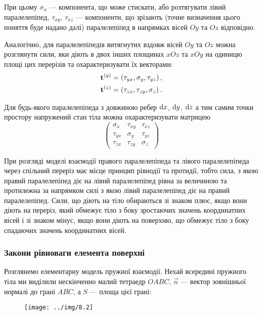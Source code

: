 \begin{remark}
	При цьому $\sigma_x$ --- компонента, що може стискати, або розтягувати лівий паралелепіпед, $\tau_{xy}$, $\tau_{xz}$ --- компоненти, що зрізають (точне визначення цього поняття буде надано далі) паралелепіпед в напрямках вісей $Oy$ та $Oz$ відповідно.
\end{remark}

Аналогічно, для паралелепіпедів витягнутих вздовж вісей $Oy$ та $Oz$ можна розглянути сили, яки діють в двох інших площинах $xOz$ та $xOy$ на одиницю площі цих перерізів та охарактеризувати їх векторами:
\begin{align}
	\bf{t}^{(y)} &= \left( \tau_{yx}, \sigma_y, \tau_{yz} \right), \\
	\bf{t}^{(z)} &= \left( \tau_{zx}, \tau_{zy}, \sigma_z \right).
\end{align}

Для будь-якого паралелепіпеда з довжиною ребер $\diff x$, $\diff y$, $\diff z$ а тим самим точки простору напружений стан тіла можна охарактеризувати матрицею
\begin{equation}
	\label{eq:3.2.3}
	\begin{pmatrix}
		\sigma_x & \tau_{xy} & \tau_{xz} \\
		\tau_{yx} & \sigma_y & \tau_{yz} \\
		\tau_{zx} & \tau_{zy} & \sigma_z
	\end{pmatrix}
\end{equation}

\begin{remark}
	При розгляді моделі взаємодії правого паралелепіпеда та лівого паралелепіпеда через спільний переріз має місце принцип рівнодії та протидії, тобто сила, з якою правий паралелепіпед діє на лівий паралелепіпед рівна за величиною та протилежна за напрямком силі з якою лівий паралелепіпед діє на правий паралелепіпед. Сили, що діють на тіло обираються зі знаком плюс, якщо вони діють на переріз, який обмежує тіло з боку зростаючих значень координатних вісей і зі знаком мінус, якщо вони діють на поверхню, що обмежує тіло з боку спадаючих значень координатних вісей.
\end{remark}

\subsubsection{Закони рівноваги елемента поверхні}

Розглянемо елементарну модель пружної взаємодії. Нехай всередині пружного тіла ми виділили нескінченно малий тетраедр $OABC$, $\vec n$ --- вектор зовнішньої нормалі до грані $ABC$, а $S$ --- площа цієї грані:
\begin{figure}[H]
	\centering
	\texttt{[image: ../img/8.2]}
\end{figure}


